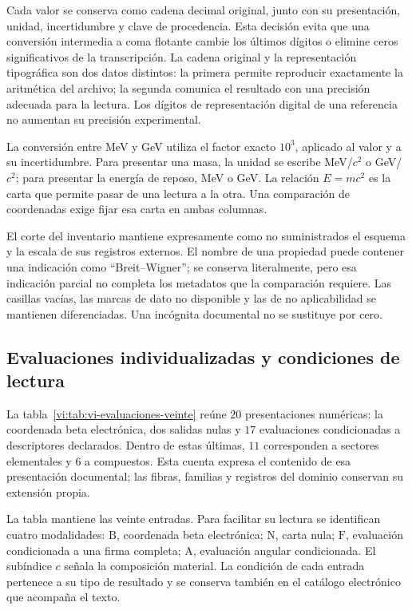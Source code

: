 Cada valor se conserva como cadena decimal original, junto con su
presentación, unidad, incertidumbre y clave de procedencia. Esta decisión
evita que una conversión intermedia a coma flotante cambie los últimos
dígitos o elimine ceros significativos de la transcripción. La cadena
original y la representación tipográfica son dos datos distintos: la
primera permite reproducir exactamente la aritmética del archivo; la
segunda comunica el resultado con una precisión adecuada para la lectura.
Los dígitos de representación digital de una referencia no aumentan su
precisión experimental.

La conversión entre MeV y GeV utiliza el factor exacto \(10^3\), aplicado
al valor y a su incertidumbre. Para presentar una masa, la unidad se escribe
MeV/\(c^2\) o GeV/\(c^2\); para presentar la energía de reposo,
MeV o GeV. La relación \(E=mc^2\) es la carta que permite pasar de una
lectura a la otra. Una comparación de coordenadas exige fijar esa carta en
ambas columnas.

El corte del inventario mantiene expresamente como no suministrados el
esquema y la escala de sus registros externos. El nombre de una propiedad
puede contener una indicación como ``Breit--Wigner''; se conserva literalmente,
pero esa indicación parcial no completa los metadatos que la comparación
requiere. Las casillas vacías, las marcas de dato no disponible y las de
no aplicabilidad se mantienen diferenciadas. Una incógnita documental
no se sustituye por cero.

\subsection{Evaluaciones individualizadas y condiciones de lectura}
\label{vi:subsec:vi-evaluaciones-documentadas}

La tabla~\ref{vi:tab:vi-evaluaciones-veinte} reúne \(20\) presentaciones
numéricas: la coordenada beta electrónica, dos salidas nulas y
\(17\) evaluaciones condicionadas a descriptores declarados. Dentro de
estas últimas, \(11\) corresponden a sectores elementales y \(6\) a
compuestos. Esta cuenta expresa el contenido de esa presentación documental;
las fibras, familias y registros del dominio conservan su extensión propia.

La tabla mantiene las veinte entradas. Para facilitar su lectura se
identifican cuatro modalidades: \(\mathrm{B}\), coordenada beta
electrónica; \(\mathrm{N}\), carta nula; \(\mathrm{F}\), evaluación
condicionada a una firma completa; \(\mathrm{A}\), evaluación angular
condicionada. El subíndice \(c\) señala la composición material. La
condición de cada entrada pertenece a su tipo de resultado y se conserva
también en el catálogo electrónico que acompaña el texto.

